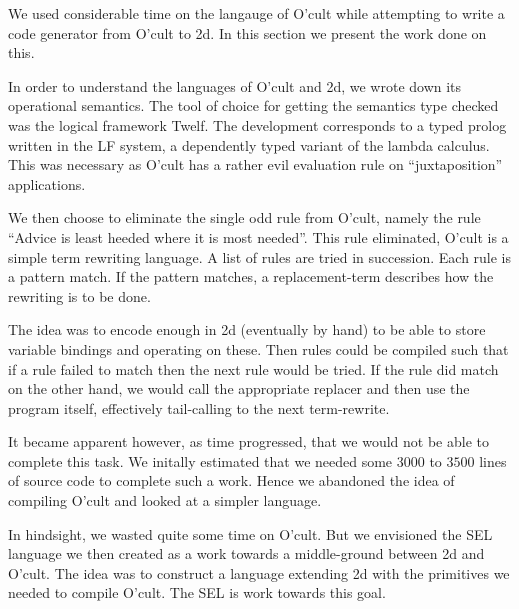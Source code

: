 
We used considerable time on the langauge of O'cult while attempting
to write a code generator from O'cult to 2d. In this section we
present the work done on this.

In order to understand the languages of O'cult and 2d, we wrote down
its operational semantics. The tool of choice for getting the
semantics type checked was the logical framework Twelf. The
development corresponds to a typed prolog written in the LF system, a
dependently typed variant of the lambda calculus. This was necessary
as O'cult has a rather evil evaluation rule on ``juxtaposition''
applications.

We then choose to eliminate the single odd rule from O'cult, namely
the rule ``Advice is least heeded where it is most needed''. This rule
eliminated, O'cult is a simple term rewriting language. A list of
rules are tried in succession. Each rule is a pattern match. If the
pattern matches, a replacement-term describes how the rewriting is to
be done.

The idea was to encode enough in 2d (eventually by hand) to be able to
store variable bindings and operating on these. Then rules could be
compiled such that if a rule failed to match then the next rule would
be tried. If the rule did match on the other hand, we would call the
appropriate replacer and then use the program itself, effectively
tail-calling to the next term-rewrite.

It became apparent however, as time progressed, that we would not be
able to complete this task. We initally estimated that we needed some
$3000$ to $3500$ lines of source code to complete such a work. Hence
we abandoned the idea of compiling O'cult and looked at a simpler
language.

In hindsight, we wasted quite some time on O'cult. But we envisioned
the SEL language we then created as a work towards a middle-ground
between 2d and O'cult. The idea was to construct a language extending
2d with the primitives we needed to compile O'cult. The SEL is work
towards this goal.

